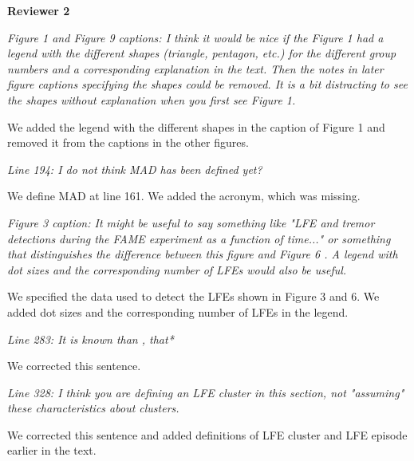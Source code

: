 \documentclass[letterpaper, 12pt]{article}
\begin{document}
\textbf{Reviewer 2}

\bigskip

\textit{Figure 1 and Figure 9 captions: I think it would be nice if the Figure 1 had a legend with the different shapes (triangle, pentagon, etc.) for the different group numbers and a corresponding explanation in the text. Then the notes in later figure captions specifying the shapes could be removed. It is a bit distracting to see the shapes without explanation when you first see Figure 1.}

\bigskip

We added the legend with the different shapes in the caption of Figure 1 and removed it from the captions in the other figures.

\bigskip

\textit{Line 194: I do not think MAD has been defined yet?}

\bigskip

We define MAD at line 161. We added the acronym, which was missing.

\bigskip

\textit{Figure 3 caption: It might be useful to say something like "LFE and tremor detections during the FAME experiment as a function of time..." or something that distinguishes the difference between this figure and Figure 6 . A legend with dot sizes and the corresponding number of LFEs would also be useful.}

\bigskip

We specified the data used to detect the LFEs shown in Figure 3 and 6. We added dot sizes and the corresponding number of LFEs in the legend.

\bigskip

\textit{Line 283: It is known than , that*}

\bigskip

We corrected this sentence.

\bigskip

\textit{Line 328: I think you are defining an LFE cluster in this section, not "assuming" these characteristics about clusters.}

\bigskip

We corrected this sentence and added definitions of LFE cluster and LFE episode earlier in the text.
\end{document}
